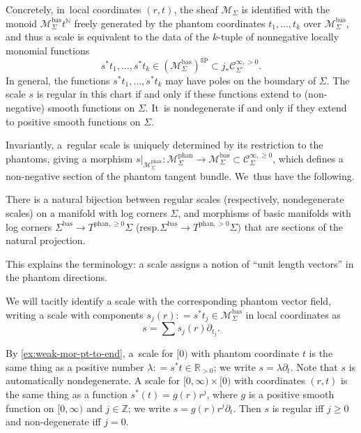 \documentclass[10pt]{amsart}
\theoremstyle{definition}
\theoremstyle{remark}
\newenvironment{example}
  {\pushQED{\qed}\renewcommand{\qedsymbol}{$\lozenge$}\examplex}
  {\popQED\endexamplex}
\newcommand{\RR}{\mathbb{R}}
\newcommand{\NN}{\mathbb{N}}
\newcommand{\ZZ}{\mathbb{Z}}
\newcommand{\halfspc}[1]{[0,\infty)^{#1}}
\renewcommand{\ge}{\geqslant}
\newcommand{\defas}{\mathrel{\mathop:}=}
\newcommand{\cM}{\mathscr{M}}
\newcommand{\cMbas}{\mathscr{M}^{\mathrm{bas}}}
\newcommand{\cMphan}{\mathscr{M}^{\mathrm{phan}}}
\newcommand{\Cinfpos}[1]{\mathscr{C}^{\infty, > 0}_{#1}}
\newcommand{\Cinfge}[1]{\mathscr{C}^{\infty, \ge 0}_{#1}}
\newcommand{\cvf}[1]{\partial_{#1}}
\newcommand{\Sig}{\Sigma}
\newcommand{\bas}[1]{{#1}^{\mathrm{bas}}}
\newcommand{\phant}{\mathrm{phan}}
\newcommand{\Sigbas}{\bas{\Sig}}
\newcommand{\intSig}{\Sigma^\circ}
\newcommand{\tbposphan}[2][]{T^{\phant,>0}_{#1}#2}
\newcommand{\tbgephan}[2][]{T^{\phant,\ge0}_{#1}#2}
\providecommand{\resp}{resp.}\providecommand{\cf}{cf.}\providecommand{\etc}{etc.}
\begin{document}
Concretely, in~local coordinates $(r,t)$, the sheaf $\cM_\Sig$ is identified with the monoid $\cMbas_\Sig t^\NN$ freely generated by the phantom coordinates $t_1,\ldots,t_k$ over $\cMbas_\Sig$, and thus a scale is equivalent to the data of the $k$-tuple of nonnegative locally monomial functions
\[
s^*t_1,\ldots,s^*t_k \in (\cMbas_{\Sig})^{\mathrm{gp}}\subset j_*\Cinfpos{\intSig}.
\]
In general, the functions $s^*t_1,\ldots, s^*t_k$ may have poles on the boundary of $\Sig$. The scale $s$ is regular in this chart if and only if these functions extend to (non-negative) smooth functions on $\Sig$. It~is nondegenerate if and only if they extend to positive smooth functions on $\Sig$.

Invariantly, a~regular scale is uniquely determined by its restriction to the phantoms, giving a morphism $s|_{\cMphan_\Sig} \colon \cMphan_{\Sig} \to \cMbas_{\Sig}\subset \Cinfge{\Sig}$, which defines a non-negative section of the phantom tangent bundle. We~thus have the following.
\begin{lemma}
There is a natural bijection between regular scales (respectively, nondegenerate scales) on a manifold with log corners $\Sig$, and morphisms of basic manifolds with log corners $\Sigbas \to \tbgephan{\Sig}$ (\resp $\Sigbas \to \tbposphan{\Sig})$ that are sections of the natural projection.
\end{lemma}

This explains the terminology: a scale assigns a notion of ``unit length vectors'' in the phantom directions.

We will tacitly identify a scale with the corresponding phantom vector field, writing a scale with components $s_j(r) \defas s^*t_j \in \cMbas_{\Sig}$ in local coordinates as
\[
s = \sum s_j(r)\cvf{t_j}.
\]

\begin{example}
By \autoref{ex:weak-mor-pt-to-end}, a~scale for $[0)$ with phantom coordinate $t$ is the same thing as a positive number $\lambda \defas s^*t \in \RR_{>0}$; we write $s = \lambda \cvf{t}$. Note that $s$ is automatically nondegenerate.
\end{example}
\begin{example}
A scale for $[0,\infty)\times [0)$ with coordinates $(r,t)$ is the same thing as a function $s^*(t)=g(r)r^j$, where $g$ is a positive smooth function on $\halfspc{}$ and $j\in\ZZ$; we write $s = g(r)r^j\cvf{t}$. Then $s$ is regular iff $j\ge 0$ and non-degenerate iff $j=0$.
\end{example}
\end{document}
